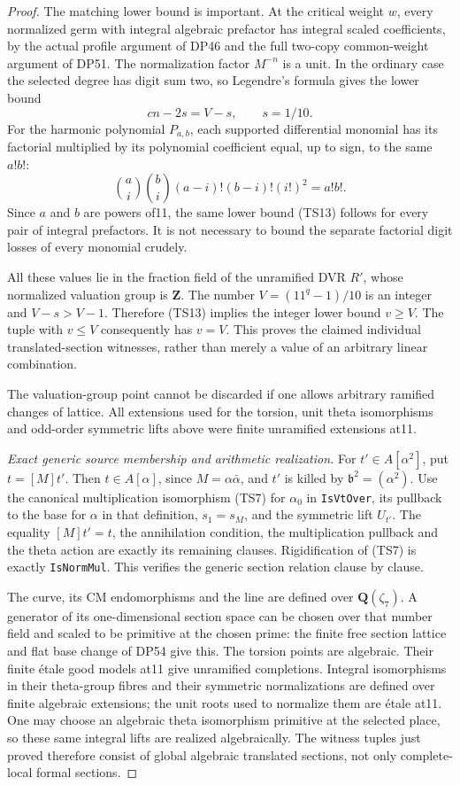 \begin{proof}
The matching lower bound is important. At the critical weight \(w\), every normalized germ with integral algebraic prefactor has integral scaled coefficients, by the actual profile argument of DP46 and the full two-copy common-weight argument of DP51. The normalization factor \(M^{-n}\) is a unit. In the ordinary case the selected degree has digit sum two, so Legendre's formula gives the lower bound \[
 cn-2s=V-s,\qquad s=1/10.
 \tag{TS13}
\] For the harmonic polynomial \(P_{a,b}\), each supported differential monomial has its factorial multiplied by its polynomial coefficient equal, up to sign, to the same \(a!b!\): \[
 \binom ai\binom bi(a-i)!(b-i)!(i!)^2=a!b!.
\] Since \(a\) and \(b\) are powers of11, the same lower bound (TS13) follows for every pair of integral prefactors. It is not necessary to bound the separate factorial digit losses of every monomial crudely.

All these values lie in the fraction field of the unramified DVR \(R'\), whose normalized valuation group is \(\mathbf Z\). The number \(V=(11^q-1)/10\) is an integer and \(V-s>V-1\). Therefore (TS13) implies the integer lower bound \(v\ge V\). The tuple with \(v\le V\) consequently has \(v=V\). This proves the claimed individual translated-section witnesses, rather than merely a value of an arbitrary linear combination.

The valuation-group point cannot be discarded if one allows arbitrary ramified changes of lattice. All extensions used for the torsion, unit theta isomorphisms and odd-order symmetric lifts above were finite unramified extensions at11.

\emph{Exact generic source membership and arithmetic realization.}
For \(t'\in A[\alpha^2]\), put \(t=[M]t'\). Then \(t\in A[\alpha]\), since \(M=\alpha\bar\alpha\), and \(t'\) is killed by \(\mathfrak b^2=(\alpha^2)\). Use the canonical multiplication isomorphism (TS7) for \(\alpha_0\) in \texttt{IsVtOver}, its pullback to the base for \(\alpha\) in that definition, \(s_1=s_M\), and the symmetric lift \(U_{t'}\). The equality \([M]t'=t\), the annihilation condition, the multiplication pullback and the theta action are exactly its remaining clauses. Rigidification of (TS7) is exactly \texttt{IsNormMul}. This verifies the generic section relation clause by clause.

The curve, its CM endomorphisms and the line are defined over \(\mathbf Q(\zeta_7)\). A generator of its one-dimensional section space can be chosen over that number field and scaled to be primitive at the chosen prime: the finite free section lattice and flat base change of DP54 give this. The torsion points are algebraic. Their finite étale good models at11 give unramified completions. Integral isomorphisms in their theta-group fibres and their symmetric normalizations are defined over finite algebraic extensions; the unit roots used to normalize them are étale at11. One may choose an algebraic theta isomorphism primitive at the selected place, so these same integral lifts are realized algebraically. The witness tuples just proved therefore consist of global algebraic translated sections, not only complete-local formal sections.


\end{proof}
